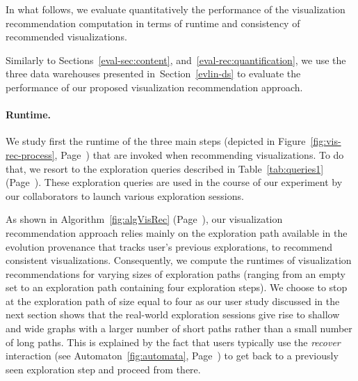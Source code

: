 \label{eval-sec:visRec}



In what follows, we evaluate quantitatively the performance of the visualization recommendation computation in terms of runtime and consistency of recommended visualizations. 


Similarly to Sections~\ref{eval-sec:content}, and~\ref{eval-rec:quantification}, we use the three data warehouses presented in~Section~\ref{evlin-ds}  to evaluate the performance of our proposed visualization recommendation approach. 



\paragraph*{\textbf{Runtime.}}
We study first the runtime of the three main steps (depicted in Figure~\ref{fig:vis-rec-process}, Page~\pageref{fig:vis-rec-process}) that are invoked when recommending visualizations.
To do that, we resort to the exploration queries described in Table~\ref{tab:queries1} (Page~\pageref{tab:queries1}).
These exploration queries are used in the course of our experiment by our collaborators to launch various exploration sessions. 


As shown in Algorithm~\ref{fig:algVisRec} (Page~\pageref{fig:algVisRec}), our visualization recommendation approach relies mainly on the exploration path available in the evolution provenance that tracks user's previous explorations, to recommend consistent visualizations.  
Consequently, we compute the runtimes of visualization recommendations for varying sizes of exploration paths (ranging from an empty set to an exploration path containing four exploration steps). We choose to stop at the exploration path of size equal to four as our user study discussed in the next section shows that the real-world exploration sessions  give rise to shallow and wide graphs with a larger number of short paths rather than a small number of long paths.
This is explained by the fact that users typically use the \emph{recover} interaction (see Automaton~\ref{fig:automata}, Page~\pageref{fig:automata}) to get back to a previously seen exploration step and proceed from there.


